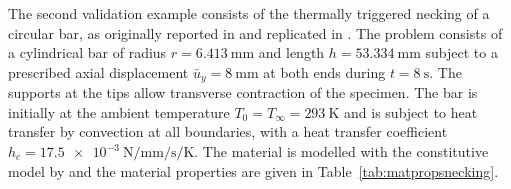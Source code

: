The second validation example consists of the thermally triggered necking of a circular bar, as originally reported in \cite{simo_associative_1992} and replicated in \cite{danowski_computational_2014}.
The problem consists of a cylindrical bar of radius $r=\SI{6.413}{\milli\meter}$ and length $h=\SI{53.334}{\milli\meter}$ subject to a prescribed axial displacement $\bar{u}_{y}=\SI{8}{\milli\meter}$ at both ends during $t=\SI{8}{\second}$.
The supports at the tips allow transverse contraction of the specimen.
The bar is initially at the ambient temperature $T_{0}=T_{\infty}=\SI{293}{\kelvin}$ and is subject to heat transfer by convection at all boundaries, with a heat transfer coefficient $h_{c} = \SI{17.5e-3}{\newton\per\milli\meter\per\second\per\kelvin}$.
The material is modelled with the constitutive model by \cite{simo_associative_1992} and the material properties are given in Table~\ref{tab:matpropsnecking}.
%
